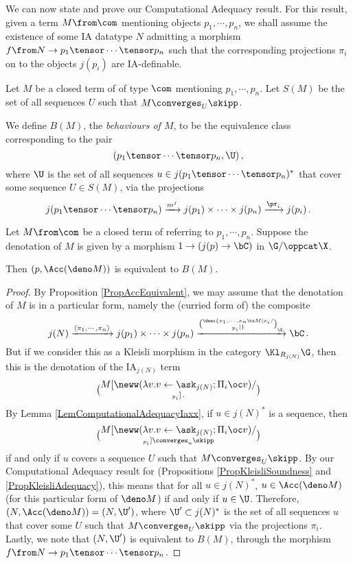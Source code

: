 We can now state and prove our Computational Adequacy result.
For this result, given a term $M\from \com$ mentioning objects $p_1,\cdots,p_n$, we shall assume the existence of some IA datatype $N$ admitting a morphism $f \from N \to p_1 \tensor \cdots \tensor p_n$ such that the corresponding projections $\pi_i$ on to the objects $j(p_i)$ are IA-definable.

\begin{definition}
  Let $M$ be a closed term of \IAXX of type $\com$ mentioning $p_1,\cdots,p_n$.
  Let $S(M)$ be the set of all sequences $U$ such that $M\converges_U\skipp$.

  We define $B(M)$, the \emph{behaviours of $M$}, to be the equivalence class corresponding to the pair
  \[
    (p_1\tensor \cdots \tensor p_n, \U)\,,
    \]
  where $\U$ is the set of all sequences $u\in j(p_1\tensor \cdots \tensor p_n)^*$ that cover some sequence $U\in S(M)$, via the projections
  \[
    j(p_1\tensor \cdots \tensor p_n) \xrightarrow{m^j} j(p_1) \times \cdots \times j(p_n) \xrightarrow{\pr_i} j(p_i)\,.
    \]
\end{definition}

\begin{theorem}
  Let $M \from \com$ be a closed term of \IAXX referring to $p_1,\cdots,p_n$.  
  Suppose the denotation of $M$ is given by a morphism $1 \to (j(p) \to \bC)$ in $\G/\oppcat\X$.  

  Then $(p,\Acc(\deno M))$ is equivalent to $B(M)$.
  \label{TheComputationalAdequacyIAXX}
\end{theorem}
\begin{proof}
  By Proposition \ref{PropAccEquivalent}, we may assume that the denotation of $M$ is in a particular form, namely the (curried form of) the composite
  \[
    j(N) \xrightarrow{\langle\pi_1,\cdots,\pi_n\rangle} j(p_1) \times \cdots \times j(p_n) \xrightarrow{\deno{x_1,\cdots,x_n\ts M[x_i/\choose_{p_i}]}_\G} \bC\,.
    \]
  But if we consider this as a Kleisli morphism in the category $\Kl_{R_{j(N)}}\G$, then this is the denotation of the IA${}_{j(N)}$ term
  \[
    M[\neww(\lambda v.v\gets \ask_{j(N)};\Pi_i\oc v)/\choose_{p_i}]\,.
    \]
  By Lemma \ref{LemComputationalAdequacyIaxx}, if $u\in j(N)^*$ is a sequence, then
  \[
    M[\neww(\lambda v.v\gets \ask_{j(N)};\Pi_i\oc v)/\choose_{p_i}]\converges_u \skipp
    \]
  if and only if $u$ covers a sequence $U$ such that $M\converges_U\skipp$.
  By our Computational Adequacy result for \IAX (Propositions \ref{PropKleisliSoundness} and \ref{PropKleisliAdequacy}), this means that for all $u\in j(N)^*$, $u\in \Acc(\deno M)$ (for this particular form of $\deno M$) if and only if $u\in \U$.
  Therefore, $(N,\Acc(\deno M)) = (N,\U')$, where $\U'\subset j(N)^*$ is the set of all sequences $u$ that cover some $U$ such that $M\converges_U\skipp$ via the projections $\pi_i$.
  Lastly, we note that $(N,\U')$ is equivalent to $B(M)$, through the morphism $f\from N \to p_1\tensor\cdots\tensor p_n$.
\end{proof}

